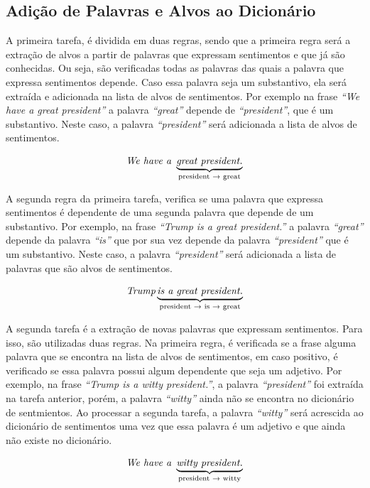 \subsection{Adição de Palavras e Alvos ao Dicionário}

A primeira tarefa, é dividida em duas regras, sendo que a primeira regra será a
extração de alvos a partir de palavras que expressam sentimentos e que já são
conhecidas. Ou seja, são verificadas todas as palavras das quais a palavra que
expressa sentimentos depende. Caso essa palavra seja um substantivo, ela será
extraída e adicionada na lista de alvos de sentimentos. Por exemplo na frase \textit{``We have a great president''} a palavra \textit{``great''} depende de \textit{``president''}, que é um substantivo. Neste caso, a palavra \textit{``president''} será adicionada a
lista de alvos de sentimentos.

\[\textit{We have a } \underbrace{\textit{great president.}}_\text{president
\textrightarrow \text{ great}}\]

A segunda regra da primeira tarefa,
verifica se uma palavra que expressa sentimentos é dependente de uma segunda
palavra que depende de um substantivo.
Por exemplo, na frase \textit{``Trump is a great president.''} a palavra
\textit{``great''} depende da palavra \textit{``is''} que por sua vez depende da
palavra \textit{``president''} que é um substantivo. Neste caso, a palavra
\textit{``president''} será adicionada a lista de palavras que são alvos de sentimentos.

\[\textit{Trump} \underbrace{\textit{is a great president.}}_\text{president
\textrightarrow \text{ is} \textrightarrow \text{ great}}\]

A segunda tarefa é a extração de novas palavras que expressam sentimentos. Para isso, são utilizadas duas
regras. Na primeira regra, é verificada se a frase alguma palavra que se
encontra na lista de alvos de sentimentos, em caso positivo, é verificado se
essa palavra possui algum dependente que seja um adjetivo. Por exemplo, na frase \textit{``Trump is a witty president.''}, a palavra \textit{``president''} foi
extraída na tarefa anterior, porém, a palavra \textit{``witty''} ainda não se
encontra no dicionário de sentmientos.
Ao processar a segunda tarefa, a palavra \textit{``witty''} será acrescida ao
dicionário de sentimentos uma vez que essa palavra é um adjetivo e que ainda não
existe no dicionário.


\[\textit{We have a } \underbrace{\textit{witty president.}}_\text{president
\textrightarrow \text{ witty}}\]

